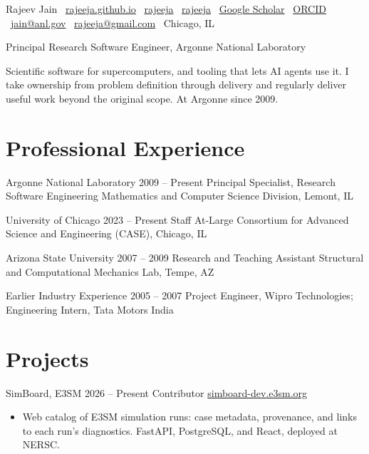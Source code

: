 \documentclass[10pt,letterpaper]{article}
\begin{document}
\sloppy
{}

\makeprofileheader
  {Rajeev Jain}
  {\faGlobe~\href{https://rajeeja.github.io}{rajeeja.github.io} \quad \faGithub~\href{https://github.com/rajeeja}{rajeeja} \quad \faLinkedin~\href{https://linkedin.com/in/rajeeja}{rajeeja} \quad \faGraduationCap~\href{https://scholar.google.com/citations?user=bC77n9MAAAAJ\&hl=en}{Google Scholar} \quad \faOrcid~\href{https://orcid.org/0000-0002-1235-918X}{ORCID}}
  {\faEnvelope~\href{mailto:jain@anl.gov}{jain@anl.gov} \quad \faEnvelope~\href{mailto:rajeeja@gmail.com}{rajeeja@gmail.com} \quad \faMapMarker~Chicago, IL}

{\large\color{mutedgray} Principal Research Software Engineer, Argonne National Laboratory}\par
\vspace{4pt}
Scientific software for supercomputers, and tooling that lets AI agents use it. I take ownership from problem definition through delivery and regularly deliver useful work beyond the original scope. At Argonne since 2009.\par
\vspace{7pt}

\section{Professional Experience}
\entryheader
  {Argonne National Laboratory}
  {2009 -- Present}
  {Principal Specialist, Research Software Engineering}
  {Mathematics and Computer Science Division, Lemont, IL}

\entryheader
  {University of Chicago}
  {2023 -- Present}
  {Staff At-Large}
  {Consortium for Advanced Science and Engineering (CASE), Chicago, IL}

\entryheader
  {Arizona State University}
  {2007 -- 2009}
  {Research and Teaching Assistant}
  {Structural and Computational Mechanics Lab, Tempe, AZ}

\entryheader
  {Earlier Industry Experience}
  {2005 -- 2007}
  {Project Engineer, Wipro Technologies; Engineering Intern, Tata Motors}
  {India}
\vspace{0.3em}

\section{Projects}
\entryheader
  {SimBoard, E3SM}
  {2026 -- Present}
  {Contributor}
  {\href{https://simboard-dev.e3sm.org/}{simboard-dev.e3sm.org}}
\begin{itemize}
  \item Web catalog of E3SM simulation runs: case metadata, provenance, and links to each run's diagnostics. FastAPI, PostgreSQL, and React, deployed at NERSC.
\end{itemize}
\end{document}
